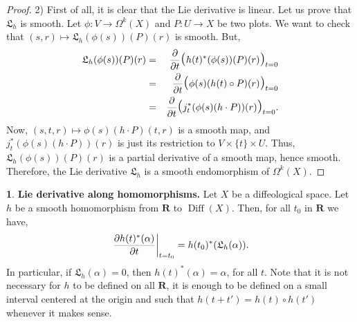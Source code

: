 \documentclass[11pt,reqno]{amsart}
\theoremstyle{definition}
\newtheorem{article}{}
\newcommand{\artlabel}[1]{{\bf #1.}}
\renewcommand{\over}{\above .2pt}
\newcommand{\RR}{{\mathbf R}}
\def \P{{P}}
\def \U{{U}}
\def \V{{V}}
\def \X{{X}}
\newcommand{\fL}{{\mathfrak  L}}
\newcommand{\Diff}{\operatorname{Diff}}
\newcommand{\DLie}{{\fL}}
\newcommand{\Llpar}{\mbox{\Large(}}
\newcommand{\Lrpar}{\mbox{\Large)}}
\begin{document}
\begin{proof}
    2) First of all, it is clear that the Lie derivative
    is linear. Let us prove that $\DLie_h$ is smooth.
    Let $\phi: \V \to \Omega^k(\X)$ and $\P: \U \to
      \X$ be two plots. We want to check that $(s,r) \mapsto
        \DLie_h(\phi(s))(\P)(r)$ is smooth. But,
    \begin{eqnarray*}
      \DLie_h(\phi(s))(\P)(r) & = &
      {\partial \over \partial t} \Llpar h(t)^*
      (\phi(s))(\P)(r)\Lrpar_{t = 0} \\
      & = & {\partial
      \over \partial t} \Llpar \phi(s)(h(t) \circ
      \P)(r)\Lrpar_{t = 0} \\
      & = & {\partial \over \partial
      t} \Llpar j_t^*(\phi(s)(h\cdot \P))(r)\Lrpar_{t = 0}.
    \end{eqnarray*}
    Now, $(s,t,r) \mapsto \phi(s)(h\cdot
      \P)(t,r)$ is a smooth map, and $j_t^*(\phi(s)(h\cdot
        \P))(r)$ is just its restriction to $\V \times\{t\}
          \times \U$. Thus, $\DLie_h(\phi(s))(\P)(r)$ is a
    partial derivative of a smooth map, hence smooth.
    Therefore, the Lie derivative $\DLie_h$ is a
    smooth endomorphism of $\Omega^k(\X)$.
  \end{proof}
  
  \begin{article}\artlabel{Lie derivative along homomorphisms} 
    \label{Lie-derivative-along-homomorphisms}
    Let $\X$ be a diffeological space. Let $h$ be a smooth homomorphism
    from $\RR$ to $\Diff(\X)$. Then, for all $t_0$
    in $\RR$ we have,
    $$
      \left.{\partial h(t)^*(\alpha) \over
      \partial t}\right\vert_{t = t_0} =
      h(t_0)^*(\DLie_h(\alpha)).
      $$
    In particular, if $\DLie_h(\alpha) = 0$,
    then $h(t)^*(\alpha) = \alpha$, for all $t$. Note that it
    is not necessary for $h$ to be defined on all $\RR$, it is
    enough to be defined on a small interval centered at
    the origin and such that $h(t+t') = h(t) \circ h(t')$ whenever it makes sense. 
    
  \end{article} %
  
\end{document}
